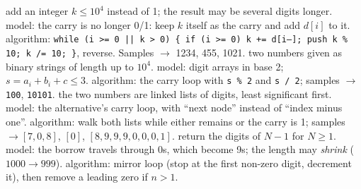 \begin{variantsbox}
  {add an integer $k \le 10^4$ instead of 1; the result may be several digits longer.}
  {model: the carry is no longer 0/1: keep $k$ itself as the carry and add $d[i]$ to it.}
  {algorithm: \texttt{while (i >= 0 || k > 0) \{ if (i >= 0) k += d[i--]; push k \% 10; k /= 10; \}}, reverse. Samples $\to$ 1234, 455, 1021.}
  {two numbers given as binary strings of length up to $10^4$.}
  {model: digit arrays in base 2; $s = a_i + b_i + c \le 3$.}
  {algorithm: the carry loop with \texttt{s \% 2} and \texttt{s / 2}; samples $\to$ \texttt{100}, \texttt{10101}.}
  {the two numbers are linked lists of digits, least significant first.}
  {model: the alternative's carry loop, with ``next node'' instead of ``index minus one''.}
  {algorithm: walk both lists while either remains or the carry is 1; samples $\to [7,0,8]$, $[0]$, $[8,9,9,9,0,0,0,1]$.}
  {return the digits of $N - 1$ for $N \ge 1$.}
  {model: the borrow travels through 0s, which become 9s; the length may \emph{shrink} ($1000 \to 999$).}
  {algorithm: mirror loop (stop at the first non-zero digit, decrement it), then remove a leading zero if $n > 1$.}
\end{variantsbox}
